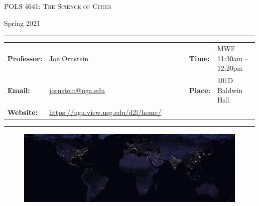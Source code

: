 \documentclass[11pt, letterpaper]{article}
\begin{document}
\begin{center}
{\Large \textsc{POLS 4641: The Science of Cities}}
\end{center}
\begin{center}
{\large Spring 2021}
\end{center}

\begin{center}
\rule{6.5in}{0.4pt}
\begin{minipage}[t]{.96\textwidth}
\begin{tabular}{llcccll}
\textbf{Professor:} & Joe Ornstein & & &  & \textbf{Time:} & MWF 11:30am -- 12:20pm \\
\textbf{Email:} &  \href{mailto:jornstein@uga.edu}{jornstein@uga.edu} & & & & \textbf{Place:} & 101D Baldwin Hall\\
\textbf{Website:} & \href{https://uga.view.usg.edu/d2l/home/2213495}{https://uga.view.usg.edu/d2l/home/} & & & & &
\end{tabular}
\end{minipage}
\rule{6.5in}{0.4pt}
\end{center}
\vspace{.15cm}
\setlength{\unitlength}{1in}
\renewcommand{\arraystretch}{2}

\begin{figure}[h]
	\centering
	\includegraphics[width = 1.03\textwidth]{img/night-lights-cropped.jpg}
\end{figure}


\onehalfspacing

\end{document}
